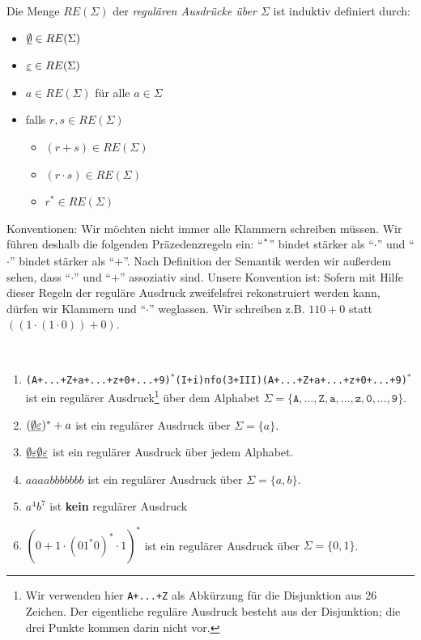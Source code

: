 \begin{Def}[name={[RE($\Sigma$)]}]
        Die Menge $RE(\Sigma)$ der \emph{regulären Ausdrücke über $\Sigma$} ist induktiv definiert durch:
        \begin{itemize}
        \item $\underline{\smash{\emptyset}}\in RE(\Sigma)$
        \item $\underline{\smash{\varepsilon}}\in RE(\Sigma)$
        \item $a\in RE(\Sigma)$ für alle $a\in\Sigma$
        \item falls $r,s\in RE(\Sigma)$
                \begin{itemize}[label=\textbullet]
                \item $(r+s)\in RE(\Sigma)$
                \item $(r\cdot s)\in RE(\Sigma)$
                \item $r^*\in RE(\Sigma)$
                \qedhere
                \end{itemize}
        \end{itemize}
\end{Def}
Konventionen: Wir möchten nicht immer alle Klammern schreiben müssen. 
Wir führen deshalb die folgenden Präzedenzregeln ein: "`$\strut^*$"' bindet stärker als "`$\cdot$"' und "`$\cdot$"' bindet stärker als "`$+$"'.
Nach Definition der Semantik werden wir außerdem sehen, dass "`$\cdot$"' und "`$+$"' assoziativ sind. 
Unsere Konvention ist: 
Sofern mit Hilfe dieser Regeln der reguläre Ausdruck zweifelsfrei rekonstruiert werden kann, dürfen wir Klammern und "`$\cdot$"' weglassen.
Wir schreiben z.B. $110 + 0$ statt $((1\cdot (1\cdot 0)) + 0)$.

\begin{Bsp}~
\begin{enumerate}
 \item \texttt{(A+...+Z+a+...+z+0+...+9)}$^*$\texttt{(I+i)nfo(3+III)(A+...+Z+a+...+z+0+...+9)}$^*$ \linebreak
 ist ein regulärer Ausdruck\footnote{Wir verwenden hier \texttt{A+...+Z} als Abkürzung für die Disjunktion aus 26 Zeichen. 
 Der eigentliche reguläre Ausdruck besteht aus der Disjunktion; die drei Punkte kommen darin nicht vor.}
 über dem Alphabet $\Sigma=\{\texttt{A},\ldots,\texttt{Z},\texttt{a},\ldots,\texttt{z},\texttt{0},\ldots,\texttt{9}\}$.
 \item $(\underline{\smash{\emptyset}}\underline{\smash{\varepsilon}})^*+a$ ist ein regulärer Ausdruck über $\Sigma=\{a\}$.
 \item $\underline{\smash{\emptyset}}\underline{\smash{\varepsilon}}\underline{\smash{\emptyset}}\underline{\smash{\varepsilon}}$ ist ein regulärer Ausdruck über jedem Alphabet.
 \item $aaaabbbbbbb$ ist ein regulärer Ausdruck über $\Sigma=\{a,b\}$.
 \item $a^4b^7$ ist \textbf{kein} regulärer Ausdruck
 \item $(0+1\cdot (01^*0)^*\cdot 1)^*$ ist ein regulärer Ausdruck über $\Sigma=\{0,1\}$.
 \qedhere
\end{enumerate}
\end{Bsp}

